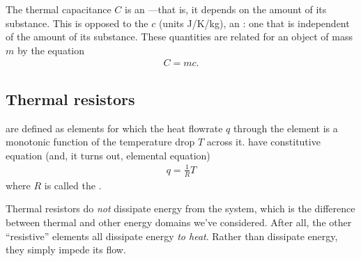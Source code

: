 \documentclass[dynamic_systems.tex]{subfiles}
\begin{document}
The thermal capacitance $C$ is an ---that is, it depends on the amount of its substance.
This is opposed to the  $c$ (units J/K/kg), an : one that is independent of the amount of its substance.
These quantities are related for an object of mass $m$ by the equation
\begin{align}
	C = m c.
\end{align}

\subsection{Thermal resistors}
\tags{}


 are defined as elements for which the heat flowrate $q$ through the element is a monotonic function of the temperature drop $T$ across it.
 have constitutive equation (and, it turns out, elemental equation)
\begin{align}
	q = \frac{1}{R} T
\end{align}
where $R$ is called the .

Thermal resistors do \emph{not} dissipate energy from the system, which is the  difference between thermal and other energy domains we've considered.
After all, the other ``resistive'' elements all dissipate energy \emph{to heat}.
Rather than dissipate energy, they simply impede its flow.
\end{document}
